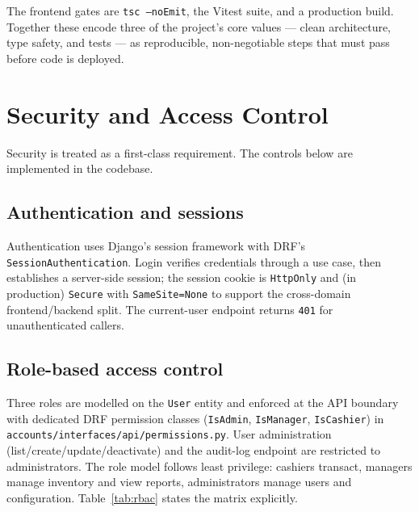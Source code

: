 \documentclass[11pt,a4paper]{article}
\begin{document}
The frontend gates are \texttt{tsc --noEmit}, the Vitest suite, and a production build. Together these
encode three of the project's core values --- clean architecture, type safety, and tests --- as
reproducible, non-negotiable steps that must pass before code is deployed.

\section{Security and Access Control}
\label{sec:security}

Security is treated as a first-class requirement. The controls below are implemented in the codebase.

\subsection{Authentication and sessions}

Authentication uses Django's session framework with DRF's \texttt{SessionAuthentication}. Login
verifies credentials through a use case, then establishes a server-side session; the session cookie is
\texttt{HttpOnly} and (in production) \texttt{Secure} with \texttt{SameSite=None} to support the
cross-domain frontend/backend split. The current-user endpoint returns \texttt{401} for unauthenticated
callers.

\subsection{Role-based access control}

Three roles are modelled on the \texttt{User} entity and enforced at the API boundary with dedicated
DRF permission classes (\texttt{IsAdmin}, \texttt{IsManager}, \texttt{IsCashier}) in
\texttt{accounts/interfaces/api/permissions.py}. User administration (list/create/update/deactivate)
and the audit-log endpoint are restricted to administrators. The role model follows least privilege:
cashiers transact, managers manage inventory and view reports, administrators manage users and
configuration. Table~\ref{tab:rbac} states the matrix explicitly.
\end{document}
